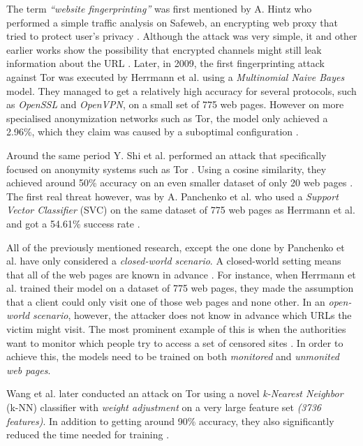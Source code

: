 The term \textit{``website fingerprinting''} was first mentioned by A. Hintz who performed a simple traffic analysis on Safeweb,
an encrypting web proxy that tried to protect user's privacy \cite{hintz2002fingerprinting}. Although the attack was very simple, it and other earlier
works show the possibility that encrypted channels might still leak information about the URL \cite{hintz2002fingerprinting, wagner1996analysis}.
Later, in 2009, the first fingerprinting attack against Tor was executed by Herrmann et al. using a \textit{Multinomial Naive Bayes} model.
They managed to get a relatively high accuracy for several protocols, such as \textit{OpenSSL} and \textit{OpenVPN}, on a small set of 775 web pages.
However on more specialised anonymization networks such as Tor, the model only achieved a 2.96\%, which they claim was caused by a suboptimal configuration \cite{herrmann2009website}.

Around the same period Y. Shi et al. performed an attack that specifically focused on anonymity systems such as Tor \cite{shi2009fingerprinting}.
Using a cosine similarity, they achieved around 50\% accuracy on an even smaller dataset of only 20 web pages \cite{shi2009fingerprinting}.
The first real threat however, was by A. Panchenko et al. who used a \textit{Support Vector Classifier} (SVC) on the same dataset of 775 web pages as Herrmann et al.
and got a 54.61\% success rate \cite{herrmann2009website, panchenko1}.

All of the previously mentioned research, except the one done by Panchenko et al. have only considered a \textit{closed-world scenario}.
A closed-world setting means that all of the web pages are known in advance \cite{panchenko1}.
For instance, when Herrmann et al. trained their model on a dataset of 775 web pages, they made the assumption that a client could only visit one of
those web pages and none other.
In an \textit{open-world scenario}, however, the attacker does not know in advance which URLs the victim might visit.
The most prominent example of this is when the authorities want to monitor which people try to access a set of censored sites \cite{panchenko1}.
In order to achieve this, the models need to be trained on both \textit{monitored} and \textit{unmonited web pages}.

Wang et al. later conducted an attack on Tor using a novel \textit{k-Nearest Neighbor} (k-NN) classifier with \textit{weight adjustment} on a very large feature set \textit{(3736 features)}.
In addition to getting around 90\% accuracy, they also significantly reduced the time needed for training \cite{wang_cai_johnson_nithyanand_goldberg_2014}.


